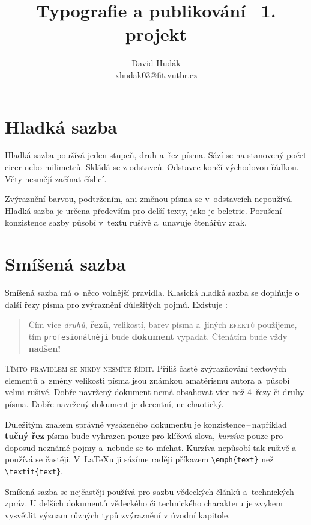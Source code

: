 \documentclass[10pt, a4paper, twocolumn]{article}
\title{Typografie a publikování\,--\,1. projekt}
\author{David Hudák\\ \href{mailto:xhudak03@fit.vutbr.cz}{xhudak03@fit.vutbr.cz}}
\date{}
\begin{document}
\maketitle
\section{Hladká sazba} %
\label{jednicka}
Hladká sazba používá jeden stupeň, druh a~řez písma.
Sází se na stanovený počet cicer nebo milimetrů.
Skládá se z odstavců. Odstavec končí východovou řádkou.
Věty nesmějí začínat číslicí.

Zvýraznění barvou, podtržením, ani změnou písma se v~odstavcích nepoužívá.
Hladká sazba je určena především pro delší texty, jako je beletrie.
Porušení konzistence sazby působí v~textu rušivě a~unavuje čtenářův zrak.

\section{Smíšená sazba}
\label{dvojka}
Smíšená sazba má o~něco volnější pravidla.
Klasická hladká sazba se doplňuje o další řezy písma pro zvýraznění důležitých pojmů.
Existuje :

\begin{quotation}

    Čím více \textit{druhů}, \textbf{řezů}, {\tiny velikostí}, {\color{red}barev} písma a~jiných \textsc{efektů} použijeme, tím \texttt{profesionálněji} bude {\Large{}\selectfont\bfseries dokument} vypadat. {\huge Č\LARGE t\Large e\large n\normalsize á \footnotesize t\scriptsize í\tiny m} bude vždy {\bfseries\Huge nadšen!}
\end{quotation}


\textsc{Tímto pravidlem se nikdy nesmíte řídit.}
Příliš časté zvýrazňování textových elementů a~změny velikosti písma jsou známkou amatérismu autora a~působí velmi ru\-šivě.
Dobře navržený dokument nemá obsahovat více než 4~řezy či druhy písma.
Dobře navržený dokument je decentní, ne chaotický.

Důležitým znakem správně vysázeného dokumentu je konzistence\,--\,například \textbf{tučný řez} písma bude vyhrazen pouze pro klíčová slova, \textit{kurzíva} pouze pro doposud neznámé pojmy a~nebude se to míchat.
Kurzíva nepůsobí tak rušivě a používá se častěji.
V~\LaTeX u ji sázíme raději příkazem \verb|\emph{text}| než \verb|\textit{text}|.

Smíšená sazba se nejčastěji používá pro sazbu vědeckých článků a~technických 
zpráv.
U delších dokumentů vědeckého či technického charakteru je zvykem vysvětlit význam různých typů zvýraznění v úvodní kapitole.
\end{document}

